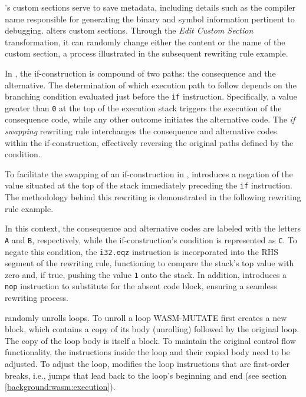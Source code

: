 


 \Wasm's custom sections serve to save metadata, including details such as the compiler name responsible for generating the binary and symbol information pertinent to debugging. 
\tool alters custom sections. 
Through the \emph{Edit Custom Section} transformation, it can randomly change either the content or the name of the custom section, a process illustrated in the subsequent rewriting rule example.




 In \Wasm, the if-construction is compound of two paths: the consequence and the alternative. 
The determination of which execution path to follow depends on the branching condition evaluated just before the \texttt{if} instruction. 
Specifically, a value greater than \texttt{0} at the top of the execution stack triggers the execution of the consequence code, while any other outcome initiates the alternative code.
The \emph{if swapping} rewriting rule interchanges the consequence and alternative codes within the if-construction, effectively reversing the original paths defined by the condition.



To facilitate the swapping of an if-construction in \Wasm, \tool introduces a negation of the value situated at the top of the stack immediately preceding the \texttt{if} instruction. 
The methodology behind this rewriting is demonstrated in the following rewriting rule example.




In this context, the consequence and alternative codes are labeled with the letters \texttt{A} and \texttt{B}, respectively, while the if-construction's condition is represented as \texttt{C}. 
To negate this condition, the \texttt{i32.eqz} instruction is incorporated into the RHS segment of the rewriting rule, functioning to compare the stack's top value with zero and, if true, pushing the value \texttt{1} onto the stack.
In addition, \tool introduces a \texttt{nop} instruction to substitute for the absent code block, ensuring a seamless rewriting process.


 \tool randomly unrolls loops.
To unroll a loop WASM-MUTATE first creates a new \wasm block, which contains a copy of its body (unrolling) followed by the original loop.
The copy of the loop body is itself a \wasm block.
To maintain the original control flow functionality, the instructions inside the loop and their copied body need to be adjusted.
To adjust the loop, \tool modifies the loop instructions that are first-order breaks, i.e., jumps that lead back to the loop's beginning and end (see section \autoref{background:wasm:execution}). 

